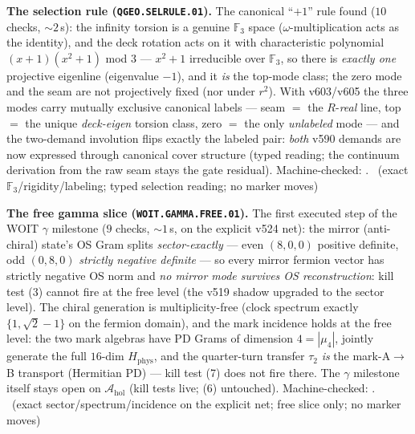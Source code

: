 \documentclass[11pt,a4paper]{article}
\theoremstyle{definition}
\begin{document}
\par\smallskip\noindent\textbf{The selection rule
(\texttt{QGEO.SELRULE.01}).}
The canonical ``$+1$'' rule found ($10$ checks, ${\sim}2$\,s): the
infinity torsion is a genuine $\mathbb{F}_3$ space
($\omega$-multiplication acts as the identity), and the deck rotation
acts on it with characteristic polynomial $(x+1)(x^2+1)$ mod $3$ ---
$x^2+1$ irreducible over $\mathbb{F}_3$, so there is \emph{exactly
one} projective eigenline (eigenvalue $-1$), and it \emph{is} the
top-mode class; the zero mode and the seam are not projectively fixed
(nor under $r^2$).  With v603/v605 the three modes carry mutually
exclusive canonical labels --- seam $=$ the $R$-\emph{real} line, top
$=$ the unique \emph{deck-eigen} torsion class, zero $=$ the only
\emph{unlabeled} mode --- and the two-demand involution flips exactly
the labeled pair: \emph{both} v590 demands are now expressed through
canonical cover structure (typed reading; the continuum derivation
from the raw seam stays the gate residual).
Machine-checked: .
\mE\ (exact $\mathbb{F}_3$/rigidity/labeling; typed selection
reading; no marker moves)
\par\smallskip

\par\smallskip\noindent\textbf{The free gamma slice
(\texttt{WOIT.GAMMA.FREE.01}).}
The first executed step of the WOIT $\gamma$ milestone ($9$ checks,
${\sim}1$\,s, on the explicit v524 net): the mirror (anti-chiral)
state's OS Gram splits \emph{sector-exactly} --- even $(8,0,0)$
positive definite, odd $(0,8,0)$ \emph{strictly negative definite}
--- so every mirror fermion vector has strictly negative OS norm and
\emph{no mirror mode survives OS reconstruction}: kill test (3)
cannot fire at the free level (the v519 shadow upgraded to the
sector level).  The chiral generation is multiplicity-free (clock
spectrum exactly $\{1,\sqrt2-1\}$ on the fermion domain), and the
mark incidence holds at the free level: the two mark algebras have
PD Grams of dimension $4=|\mu_4|$, jointly generate the full
$16$-dim $H_{\mathrm{phys}}$, and the quarter-turn transfer
$\tau_2$ \emph{is} the mark-A$\to$B transport (Hermitian PD) ---
kill test (7) does not fire there.  The $\gamma$ milestone itself
stays open on $\mathcal A_{\mathrm{hol}}$ (kill tests live; (6)
untouched).
Machine-checked: .
\mE\ (exact sector/spectrum/incidence on the explicit net; free
slice only; no marker moves)
\par\smallskip
\end{document}
